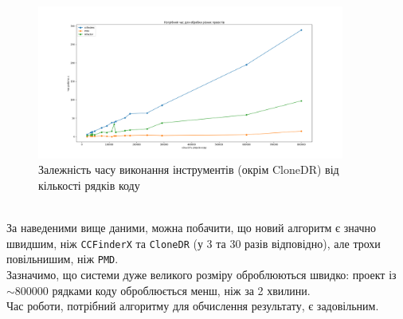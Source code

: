 \documentclass[a4paper, 14pt]{article}
\begin{document}
\begin{figure}[h]
    \centering
    \includegraphics[width=0.9\textwidth]{graph2}
    \caption{\centering Залежність часу виконання інструментів (окрім CloneDR) від кількості рядків коду}
\end{figure} \hfill \\
За наведеними вище даними, можна побачити, що новий алгоритм є значно швидшим, ніж \verb|CCFinderX| та \verb|CloneDR| (у $3$ та $30$ разів відповідно), але трохи повільнишим, ніж \verb|PMD|. \\
Зазначимо, що системи дуже великого розміру оброблюються швидко: проект із $\sim$800000 рядками коду оброблюється менш, ніж за 2 хвилини. \\
Час роботи, потрібний алгоритму для обчислення результату, є задовільним.
\end{document}
